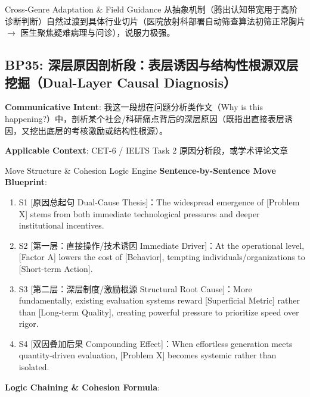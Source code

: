 \endgroup
\vspace{4pt}
\begin{TipBox}{Cross-Genre Adaptation \& Field Guidance}
从抽象机制（腾出认知带宽用于高阶诊断判断）自然过渡到具体行业切片（医院放射科部署自动筛查算法初筛正常胸片 $\to$ 医生聚焦疑难病理与问诊），说服力极强。
\end{TipBox}
\vspace{8pt}
\subsection{BP35: 深层原因剖析段：表层诱因与结构性根源双层挖掘（Dual-Layer Causal Diagnosis）}\label{sec:bp:BP35}
\noindent\textbf{\color{AcadNavy}Communicative Intent}: 我这一段想在问题分析类作文（Why is this happening?）中，剖析某个社会/科研痛点背后的深层原因（既指出直接表层诱因，又挖出底层的考核激励或结构性根源）。\par\vspace{2pt}
\noindent\textbf{\color{AcadSlate}Applicable Context}: CET-6 / IELTS Task 2 原因分析段，或学术评论文章\par\vspace{4pt}
\begin{ConceptBox}{Move Structure \& Cohesion Logic Engine}
\textbf{Sentence-by-Sentence Move Blueprint}:
\begin{enumerate}[label=\textbf{\color{AcadNavy}S\arabic*.}, leftmargin=2em, itemsep=2pt]
  \item S1 [原因总起句 Dual-Cause Thesis]：The widespread emergence of [Problem X] stems from both immediate technological pressures and deeper institutional incentives.
  \item S2 [第一层：直接操作/技术诱因 Immediate Driver]：At the operational level, [Factor A] lowers the cost of [Behavior], tempting individuals/organizations to [Short-term Action].
  \item S3 [第二层：深层制度/激励根源 Structural Root Cause]：More fundamentally, existing evaluation systems reward [Superficial Metric] rather than [Long-term Quality], creating powerful pressure to prioritize speed over rigor.
  \item S4 [双因叠加后果 Compounding Effect]：When effortless generation meets quantity-driven evaluation, [Problem X] becomes systemic rather than isolated.
\end{enumerate}\par\vspace{4pt}
\textbf{Logic Chaining \& Cohesion Formula}:\par{}
\end{ConceptBox}
